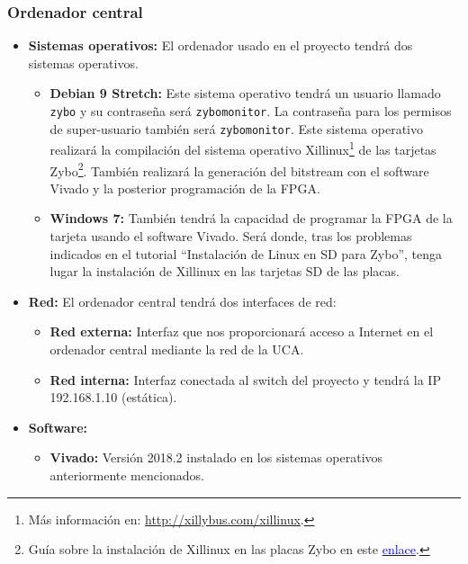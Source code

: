 \newpage
\subsubsection{Ordenador central}
\begin{itemize}
	\item \textbf{Sistemas operativos:} El ordenador usado en el proyecto tendrá dos sistemas operativos.
	\begin{itemize}
		\item \textbf{Debian 9 Stretch:} Este sistema operativo tendrá un usuario llamado \texttt{zybo} y su contraseña será \texttt{zybomonitor}. La contraseña para los permisos de super-usuario también será \texttt{zybomonitor}. Este sistema operativo realizará la compilación del sistema operativo Xillinux\footnote{Más información en: \url{http://xillybus.com/xillinux}.} de las tarjetas Zybo\footnote{Guía sobre la instalación de Xillinux en las placas Zybo en este \href{http://diebotreise.blogspot.com/2017/03/tutorial-zybo-linux-i-como-cargar-linux.html}{\textcolor{blue}{enlace}}.}. También realizará la generación del bitstream con el software Vivado y la posterior programación de la FPGA.
		\item \textbf{Windows 7:} También tendrá la capacidad de programar la FPGA de la tarjeta usando el software Vivado. Será donde, tras los problemas indicados en el tutorial ``Instalación de Linux en SD para Zybo'', tenga lugar la instalación de Xillinux en las tarjetas SD de las placas.
	\end{itemize}

	\item \textbf{Red:} El ordenador central tendrá dos interfaces de red:
	\begin{itemize}
		\item \textbf{Red externa:} Interfaz que nos proporcionará acceso a Internet en el ordenador central mediante la red de la UCA.
		\item \textbf{Red interna:} Interfaz conectada al switch del proyecto y tendrá la IP 192.168.1.10 (estática).
	\end{itemize}

	\item \textbf{Software:}
	\begin{itemize}
		\item \textbf{Vivado:} Versión 2018.2 instalado en los sistemas operativos anteriormente mencionados.
	\end{itemize}
\end{itemize}


